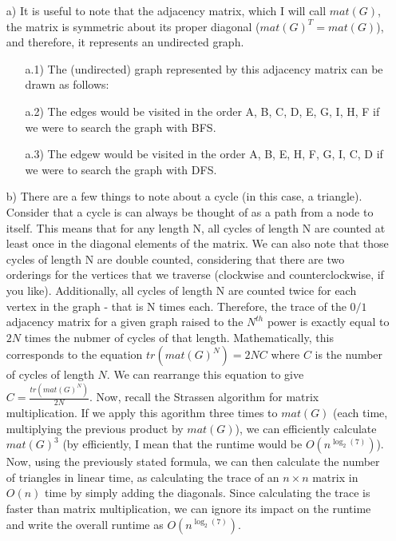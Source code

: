 \documentclass{article}
\newcommand{\plain}{\node[shape = circle, draw = black]}
\begin{document}
\begin{solution}

\begin{itemize}
	\item[a)]{} It is useful to note that the adjacency matrix, which I will call $mat(G)$, the matrix is symmetric about its proper diagonal ($mat(G)^T=mat(G)$), and therefore, it represents an undirected graph.
		\begin{itemize}
			\item[a.1)]{} The (undirected) graph represented by this adjacency matrix can be drawn as follows:
				\vskip 0.15in
			\item[a.2)]{} The edges would be visited in the order A, B, C, D, E, G, I, H, F if we were to search the graph with BFS.
			\item[a.3)]{} The edgew would be visited in the order A, B, E, H, F, G, I, C, D if we were to search the graph with DFS.
		\end{itemize}
	\item[b)]{} There are a few things to note about a cycle (in this case, a triangle).  Consider that a cycle is can always be thought of as a path from a node to itself.  This means that for any length N, all cycles of length N are counted at least once in the diagonal elements of the matrix.  We can also note that those cycles of length N are double counted, considering that there are two orderings for the vertices that we traverse (clockwise and counterclockwise, if you like).  Additionally, all cycles of length N are counted twice for each vertex in the graph - that is N times each.  Therefore, the trace of the $0/1$ adjacency matrix for a given graph raised to the $N^{th}$ power is exactly equal to $2N$ times the nubmer of cycles of that length.  Mathematically, this corresponds to the equation $tr(mat(G)^N)=2NC$ where $C$ is the number of cycles of length $N$.  We can rearrange this equation to give $C=\frac{tr(mat(G)^N)}{2N}$.  Now, recall the Strassen algorithm for matrix multiplication.  If we apply this agorithm three times to $mat(G)$ (each time, multiplying the previous product by $mat(G)$), we can efficiently calculate $mat(G)^3$ (by efficiently, I mean that the runtime would be $O(n^{\log_2(7)})$). Now, using the previously stated formula, we can then calculate the number of triangles in linear time, as calculating the trace of an $n \times n$ matrix in $O(n)$ time by simply adding the diagonals.  Since calculating the trace is faster than matrix multiplication, we can ignore its impact on the runtime and write the overall runtime as $O(n^{\log_2(7)})$.

\end{itemize}
\end{solution}
\end{document}
